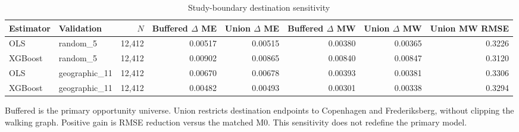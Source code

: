 \begin{landscape}
\begin{table}[p]
\centering
\small
\begin{threeparttable}
\caption{Study-boundary destination sensitivity}\label{tab:app-boundary-sensitivity}
\begin{tabular}{>{\raggedright\arraybackslash}p{2cm}>{\raggedright\arraybackslash}p{3cm}rrrrrr}
\toprule
Estimator & Validation & $N$ & Buffered $\Delta$ ME & Union $\Delta$ ME & Buffered $\Delta$ MW & Union $\Delta$ MW & Union MW RMSE \\
\midrule
OLS & random\_\allowbreak{}5 & 12,412 & 0.00517 & 0.00515 & 0.00380 & 0.00365 & 0.3226 \\
XGBoost & random\_\allowbreak{}5 & 12,412 & 0.00902 & 0.00865 & 0.00840 & 0.00847 & 0.3120 \\
OLS & geographic\_\allowbreak{}11 & 12,412 & 0.00670 & 0.00678 & 0.00393 & 0.00381 & 0.3306 \\
XGBoost & geographic\_\allowbreak{}11 & 12,412 & 0.00482 & 0.00493 & 0.00301 & 0.00338 & 0.3294 \\
\bottomrule
\end{tabular}
\begin{tablenotes}[flushleft]\footnotesize
\item Buffered is the primary opportunity universe. Union restricts destination endpoints to Copenhagen and Frederiksberg, without clipping the walking graph. Positive gain is RMSE reduction versus the matched M0. This sensitivity does not redefine the primary model.
\end{tablenotes}
\end{threeparttable}
\end{table}
\end{landscape}
